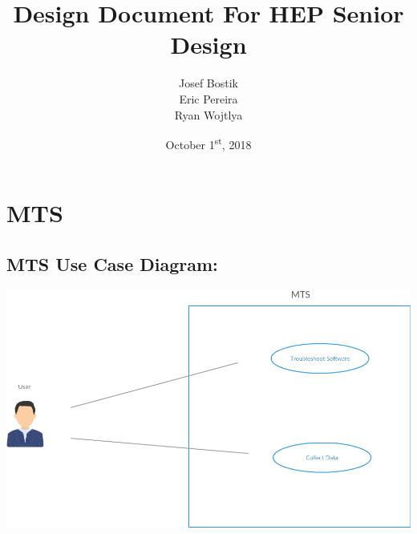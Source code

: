 \documentclass[12pt]{article}
\begin{document}
\begin{titlepage}
	

\author{Josef Bostik\\
	Eric Pereira\\
	Ryan Wojtlya\\}
\date{October 1\textsuperscript{st}, 2018}
\title{Design Document For HEP Senior Design}
\maketitle
\end{titlepage}
\tableofcontents
\newpage
{}

\section*{MTS}
%
\subsection*{MTS Use Case Diagram:} 
%
\graphicspath{{./Images/}}
\begin{center}
  \includegraphics[scale=0.69]{MTS.png}
\end{center}
\newline
\end{document}
